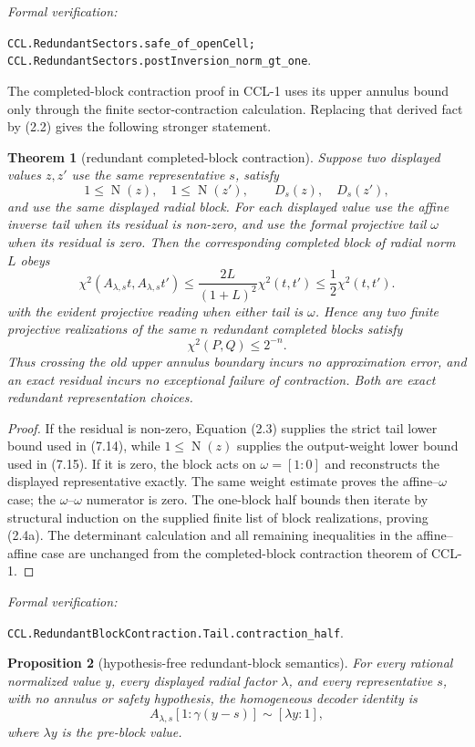 \documentclass[10pt]{article}
\newtheorem{theorem}{Theorem}[section]
\newtheorem{proposition}[theorem]{Proposition}
\theoremstyle{definition}
\theoremstyle{remark}
\newcommand{\Norm}{\operatorname{N}}
\newcommand{\leanref}[1]{\par\smallskip\noindent
  \emph{Formal verification:}\par\nobreak
  {\raggedright\nolinkurl{#1}.\par}}
\newcommand{\Proj}[2]{[#1:#2]}
\begin{document}
\leanref{CCL.RedundantSectors.safe_of_openCell;
CCL.RedundantSectors.postInversion_norm_gt_one}

The completed-block contraction proof in CCL-1 uses its upper annulus bound
only through the finite sector-contraction calculation.  Replacing that
derived fact by (2.2) gives the following stronger statement.

\begin{theorem}[redundant completed-block contraction]\label{thm:redundant-block-contraction}
Suppose two displayed values $z,z'$ use the same representative $s$, satisfy
\[
 1\le\Norm(z),\quad 1\le\Norm(z'),
 \qquad D_s(z),\quad D_s(z'),
\]
and use the same displayed radial block.
For each displayed value use the affine inverse tail when its residual is
non-zero, and use the formal projective tail $\omega$ when its residual is
zero.  Then the corresponding completed block of radial norm $L$ obeys
\[
 \chi^2(A_{\lambda,s}t,A_{\lambda,s}t')
 \le \frac{2L}{(1+L)^2}\chi^2(t,t')
 \le\frac12\chi^2(t,t').
\tag{2.4}
\]
with the evident projective reading when either tail is $\omega$.  Hence any
two finite projective realizations of the same $n$ redundant completed blocks
satisfy
\[
 \chi^2(P,Q)\le 2^{-n}.
\tag{2.4a}
\]
Thus crossing the old upper annulus boundary incurs no approximation error,
and an exact residual incurs no exceptional failure of contraction.  Both are
exact redundant representation choices.
\end{theorem}

\begin{proof}
If the residual is non-zero, Equation (2.3) supplies the strict tail lower
bound used in (7.14), while $1\le\Norm(z)$ supplies the output-weight lower
bound used in (7.15).  If it is zero, the block acts on $\omega=[1:0]$ and
reconstructs the displayed representative exactly.  The same weight estimate
proves the affine--$\omega$ case; the $\omega$--$\omega$ numerator is zero.
The one-block half bounds then iterate by structural induction on the supplied
finite list of block realizations, proving (2.4a).  The determinant calculation
and all remaining inequalities in the affine--affine case are unchanged from
the completed-block contraction theorem of CCL-1.
\end{proof}

\leanref{CCL.RedundantBlockContraction.Tail.contraction_half}

\begin{proposition}[hypothesis-free redundant-block semantics]
\label{prop:redundant-block-exact}
For every rational normalized value $y$, every displayed radial factor
$\lambda$, and every representative $s$, with no annulus or safety
hypothesis, the homogeneous decoder identity is
\[
 A_{\lambda,s}
   \Proj{1}{\gamma(y-s)}\sim\Proj{\lambda y}{1},
\tag{2.4b}
\]
where $\lambda y$ is the pre-block value.
\end{proposition}
\end{document}
